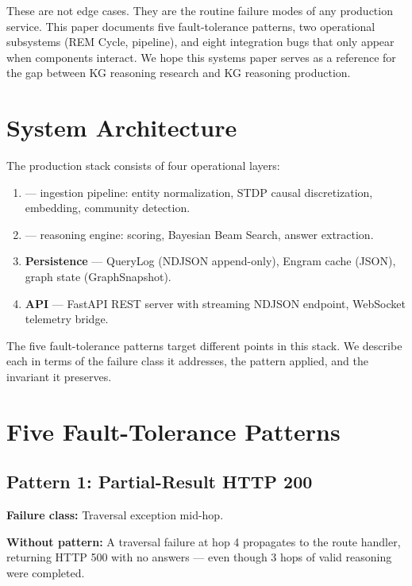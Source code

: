 \documentclass[10pt,twocolumn]{article}
\begin{document}
These are not edge cases. They are the routine failure modes of any production service.
This paper documents five fault-tolerance patterns, two operational subsystems (REM
Cycle, \THALAMUS{} pipeline), and eight integration bugs that only appear when
components interact. We hope this systems paper serves as a reference for the gap between
KG reasoning research and KG reasoning production.

\section{System Architecture}
\label{sec:arch}

The \CEREBRUM{} production stack consists of four operational layers:

\begin{enumerate}
  \item \textbf{\THALAMUS{}} — ingestion pipeline: entity normalization, STDP causal
        discretization, embedding, community detection.
  \item \textbf{\CORTEX{}} — reasoning engine: \CSA{} scoring, Bayesian Beam Search,
        answer extraction.
  \item \textbf{Persistence} — QueryLog (NDJSON append-only), Engram cache (JSON),
        graph state (GraphSnapshot).
  \item \textbf{API} — FastAPI REST server with streaming NDJSON endpoint, WebSocket
        telemetry bridge.
\end{enumerate}

The five fault-tolerance patterns target different points in this stack. We describe each
in terms of the failure class it addresses, the pattern applied, and the invariant it
preserves.

\section{Five Fault-Tolerance Patterns}
\label{sec:patterns}

\subsection{Pattern 1: Partial-Result HTTP 200}

\textbf{Failure class:} Traversal exception mid-hop.

\textbf{Without pattern:} A traversal failure at hop 4 propagates to the route handler,
returning HTTP 500 with no answers — even though 3 hops of valid reasoning were completed.
\end{document}
